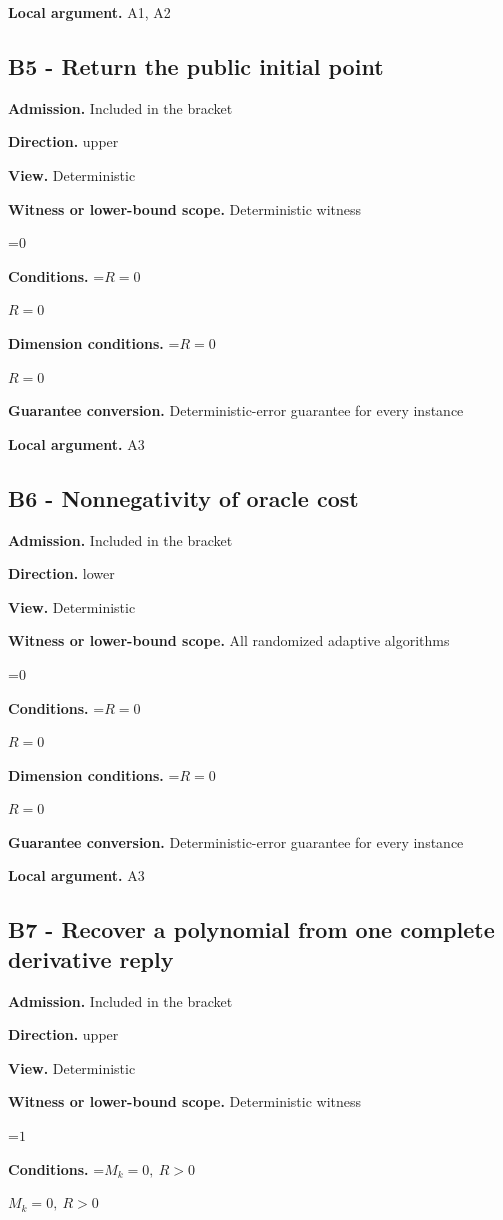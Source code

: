 \documentclass[10pt,a4paper]{article}
\newcommand{\AtlasMath}[1]{\par\begingroup\centering\setbox0=\hbox{$\displaystyle #1$}\ifdim\wd0>1.4\linewidth\typeout{ATLAS WIDE FORMULA: \the\wd0}\fi\ifdim\wd0>\linewidth\resizebox{\linewidth}{!}{\box0}\else\box0\fi\par\endgroup}
\newcommand{\AtlasInlineMath}[1]{\begingroup\setbox0=\hbox{$#1$}\ifdim\wd0>.4\linewidth\endgroup\AtlasMath{#1}\else\endgroup$#1$\fi}
\begin{document}
\textbf{Local argument.} A1, A2

\subsection{B5 - Return the public initial point}
\textbf{Admission.} Included in the bracket

\textbf{Direction.} upper

\textbf{View.} Deterministic

\textbf{Witness or lower-bound scope.} Deterministic witness

\AtlasMath{0}
\textbf{Conditions.} \AtlasInlineMath{R=0}

\textbf{Dimension conditions.} \AtlasInlineMath{R=0}

\textbf{Guarantee conversion.} Deterministic-error guarantee for every instance

\textbf{Local argument.} A3

\subsection{B6 - Nonnegativity of oracle cost}
\textbf{Admission.} Included in the bracket

\textbf{Direction.} lower

\textbf{View.} Deterministic

\textbf{Witness or lower-bound scope.} All randomized adaptive algorithms

\AtlasMath{0}
\textbf{Conditions.} \AtlasInlineMath{R=0}

\textbf{Dimension conditions.} \AtlasInlineMath{R=0}

\textbf{Guarantee conversion.} Deterministic-error guarantee for every instance

\textbf{Local argument.} A3

\subsection{B7 - Recover a polynomial from one complete derivative reply}
\textbf{Admission.} Included in the bracket

\textbf{Direction.} upper

\textbf{View.} Deterministic

\textbf{Witness or lower-bound scope.} Deterministic witness

\AtlasMath{1}
\textbf{Conditions.} \AtlasInlineMath{M_k=0,\ R>0}
\end{document}
